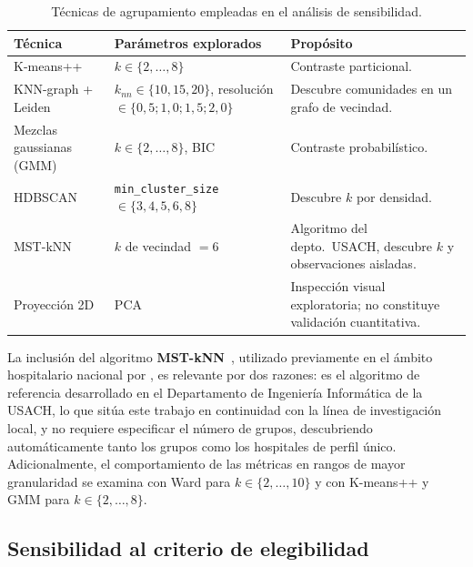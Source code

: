 \begin{table}[htbp]
\centering
\caption{Técnicas de agrupamiento empleadas en el análisis de sensibilidad.}
\label{tab:sensibilidad}
\begin{tabular}{p{4.2cm} p{3.0cm} p{4.5cm}}
\toprule
\textbf{Técnica} & \textbf{Parámetros explorados} & \textbf{Propósito} \\
\midrule
K-means++ & $k \in \{2, \ldots, 8\}$ & Contraste particional. \\
\addlinespace
KNN-graph + Leiden & $k_{nn} \in \{10, 15, 20\}$, resolución $\in \{0{,}5; 1{,}0; 1{,}5; 2{,}0\}$ & Descubre comunidades en un grafo de vecindad. \\
\addlinespace
Mezclas gaussianas (GMM) & $k \in \{2, \ldots, 8\}$, BIC & Contraste probabilístico. \\
\addlinespace
HDBSCAN & \texttt{min\_cluster\_size} $\in \{3, 4, 5, 6, 8\}$ & Descubre $k$ por densidad. \\
\addlinespace
MST-kNN & $k$ de vecindad $=6$ & Algoritmo del depto.\ USACH,
descubre $k$ y observaciones aisladas. \\
\addlinespace
Proyección 2D & PCA & Inspección visual exploratoria; no constituye validación cuantitativa. \\
\bottomrule
\end{tabular}
\end{table}

La inclusión del algoritmo \textbf{MST-kNN}~\citep{inostroza2008}, utilizado previamente en el ámbito hospitalario nacional por \citet{Villalobos2016}, es relevante por dos
razones: es el algoritmo de referencia desarrollado en el Departamento de
Ingeniería Informática de la USACH, lo que sitúa este trabajo en continuidad con
la línea de investigación local, y no requiere especificar el número de grupos,
descubriendo automáticamente tanto los grupos como los hospitales de perfil
único. Adicionalmente, el comportamiento de las métricas en rangos de mayor
granularidad se examina con Ward para $k \in \{2, \ldots, 10\}$ y con K-means++
y GMM para $k \in \{2, \ldots, 8\}$.

\subsection{Sensibilidad al criterio de elegibilidad}
\label{sec:sensibilidad-elegibilidad}

